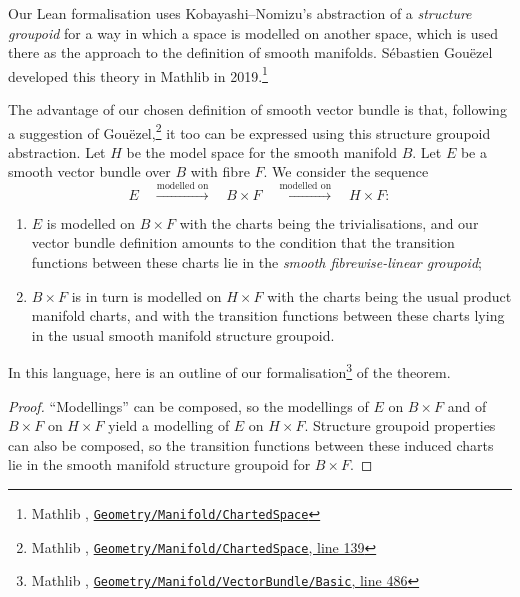 \documentclass[runningheads]{llncs}
\begin{document}
Our Lean formalisation
uses Kobayashi--Nomizu's abstraction of a \emph{structure groupoid} \cite{KN63}
for a way in which a space is modelled on another space,
which is used there as the approach to the definition of smooth manifolds.
S\'ebastien Gou\"ezel developed this theory in Mathlib in 2019.\footnote{
  Mathlib \cite{Mathlib}, \href{https://github.com/leanprover-community/mathlib4/blob/21b3a48ba0f69a4ae9eb44dbacbc4de43a6290bf/Mathlib/Geometry/Manifold/ChartedSpace.lean}{\texttt{Geometry/Manifold/ChartedSpace}}
}

The advantage of our chosen definition of smooth vector bundle
is that, following a suggestion of Gou\"ezel,\footnote{
  Mathlib \cite{Mathlib}, \href{https://github.com/leanprover-community/mathlib4/blob/21b3a48ba0f69a4ae9eb44dbacbc4de43a6290bf/Mathlib/Geometry/Manifold/ChartedSpace.lean\#L139}{\texttt{Geometry/Manifold/ChartedSpace}, line 139}
} 
it too can be expressed using this structure groupoid abstraction.
  Let $H$ be the model space for the smooth manifold $B$.  Let $E$ be a smooth vector bundle over
  $B$ with fibre $F$. We consider the sequence
  \[
    E \quad \xrightarrow{\text{modelled on}} \quad B \times F \quad \xrightarrow{\text{modelled on}} \quad H \times F:
  \]
\begin{enumerate}
  \item $E$ is modelled on $B \times F$ with the charts being the trivialisations,
      and our vector bundle definition amounts to the condition that the transition functions between these charts lie in the \emph{smooth fibrewise-linear
       groupoid};
  \item $B \times F$ is in turn is modelled on $H \times F$ with the charts being the usual
    product manifold charts, and with the transition functions between these charts lying in the
    usual smooth manifold structure groupoid.
\end{enumerate}
In this language, here is an outline of our formalisation\footnote{
  Mathlib \cite{Mathlib}, \href{https://github.com/leanprover-community/mathlib4/blob/21b3a48ba0f69a4ae9eb44dbacbc4de43a6290bf/Mathlib/Geometry/Manifold/VectorBundle/Basic.lean\#L486}{\texttt{Geometry/Manifold/VectorBundle/Basic}, line 486}}
of the theorem.

\begin{proof}
  ``Modellings'' can be composed, so the modellings of $E$ on $B \times F$ and of $B \times F$ on
$H \times F$ yield a modelling of $E$ on $H \times F$. Structure groupoid properties can also
be composed, so the transition functions between these induced charts lie in the smooth manifold
structure groupoid for $B \times F$.
\end{proof}
\end{document}
